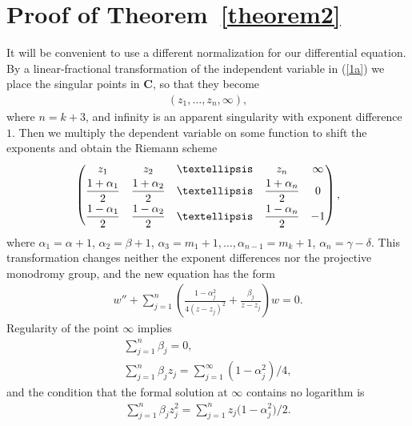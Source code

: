 \documentclass[11pt]{article}
\numberwithin{equation}{section}
\def\C{\mathbf{C}}
\def\lc{,\allowbreak\ldots,\allowbreak}
\let\ds\displaystyle
\begin{document}
\setcounter{section}{2}
\setcounter{subsection}{0}
\setcounter{subsubsection}{0}
\setcounter{thm}{5}
\setcounter{equation}{5}
\section{Proof of Theorem~\ref{theorem2}}\label{section3}

It will be convenient to use a different normalization for our differential equation. By a linear-fractional transformation of the independent variable in (\ref{1a}) we place the singular points in $\C$, so that they become
\begin{gather*}
(z_1,\ldots,z_n,\infty),
\end{gather*}
where $n=k+3$, and infinity is an apparent singularity with exponent difference $1$. Then we multiply the dependent variable on some function to shift the exponents and obtain the Riemann scheme
\begin{gather}\label{rs}
\left(\begin{matrix}z_1&z_2&\ldots&z_n&\infty\vspace{1mm}\\
\ds\frac{1+\alpha_1}{2}&\ds\frac{1+\alpha_2}{2}&\ds\ldots&
\ds\frac{1+\alpha_n}{2}& 0\vspace{1mm}\\
\ds\frac{1-\alpha_1}{2}&\ds\frac{1-\alpha_2}{2}&\ds\ldots&
\ds\frac{1-\alpha_n}{2}&-1\end{matrix}\right),
\end{gather}
where $\alpha_1=\alpha+1$, $\alpha_2=\beta+1$, $\alpha_3=m_1+1\lc \alpha_{n-1}=m_k+1$, $\alpha_n=\gamma-\delta$. This transformation changes neither the exponent differences nor the projective monodromy group, and the new equation has the form
\begin{gather}\label{1b}
w''+\sum_{j=1}^n\left(\frac{1-\alpha_j^2}{4(z-z_j)^2} +\frac{\beta_j}{z-z_j}\right)w=0.
\end{gather}
Regularity of the point $\infty$ implies
\begin{gather}\label{1}
\sum_{j=1}^n\beta_j=0,\\
\label{2}
\sum_{j=1}^n\beta_jz_j=\sum_{j=1}^\infty(1-\alpha_j^2)/4,
\end{gather}
and the condition that the formal solution at $\infty$ contains no logarithm is
\begin{gather}\label{3a}
\sum_{j=1}^n\beta_jz_j^2=\sum_{j=1}^n z_j\big(1-\alpha_j^2\big)/2.
\end{gather}
\end{document}
